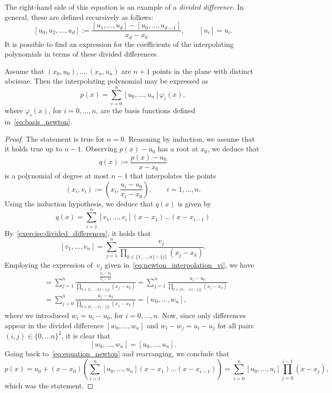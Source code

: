 The right-hand side of this equation is an example of a \emph{divided difference}.
In general, these are defined recursively as follows:
\[
    [u_{0}, u_{2}, \dotsc, u_{d}] := \frac{[u_{1}, \dotsc, u_{d}] - [u_{0}, \dotsc, u_{d-1}]}{x_{d}-x_{0}}, \qquad [u_i] = u_i.
\]
It is possible to find an expression for the coefficients of the interpolating polynomials in terms of these divided differences.
\begin{proposition}
    Assume that $(x_0, u_0), \dotsc, (x_n, u_n)$ are $n+1$ points in the plane with distinct abcissae.
    Then the interpolating polynomial may be expressed as
    \[
        p(x) = \sum_{i=0}^{n} [u_0, \dotsc, u_n] \varphi_i(x),
    \]
    where $\varphi_i(x)$, for $i = 0, \dotsc, n$, are the basis functions defined in~\eqref{eq:basis_newton}.
\end{proposition}
\begin{proof}
    The statement is true for $n = 0$.
    Reasoning by induction, we assume that it holds true up to $n-1$.
    Observing $p(x) - u_0$ has a root at $x_0$,
    we deduce that
    \begin{equation}
        \label{eq:equation_newton}
        q(x) :=
        \frac{p(x) - u_0}{x - x_0}
    \end{equation}
    is a polynomial of degree at most $n-1$ that interpolates the points
    \begin{equation}
        \label{eq:newton_interpolation_vi}
        \left(x_i, v_i\right) := \left(x_i, \frac{u_i - u_0}{x_i - x_0}\right), \qquad i = 1, \dotsc, n.
    \end{equation}
    Using the induction hypothesis,
    we deduce that $q(x)$ is given by
    \[
        q(x) = \sum_{i=1}^{n} [v_1, \dotsc, v_i] (x-x_1) \dotsc (x - x_{i-1})
    \]
    By~\cref{exercise:divided_differences},
    it holds that
    \[
        [v_1, \dotsc, v_n] = \sum_{j=1}^{n} \frac{v_{j}}{\prod_{ k \in \{1, \dotsc, n\} \backslash \{ j\}} (x_{j} - x_{k})}.
    \]
    Employing the expression of~$v_j$ given in~\eqref{eq:newton_interpolation_vi},
    we have
    \begin{align*}
        [v_1, \dotsc, v_n]
        &= \sum_{j=1}^{n} \frac{\frac{u_{j}-u_0}{x_j - x_0}}{\prod_{ k \in \{1, \dotsc, n\} \backslash \{ j\}} (x_{j} - x_{k})}
        = \sum_{j=1}^{n} \frac{u_{j}-u_0}{\prod_{ k \in \{0, \dotsc, n\} \backslash \{ j\}} (x_{j} - x_{k})} \\
        &= \sum_{j=0}^{n} \frac{u_{j}-u_0}{\prod_{ k \in \{0, \dotsc, n\} \backslash \{ j\}} (x_{j} - x_{k})} = [w_0, \dotsc, w_n],
    \end{align*}
    where we introduced $w_i = u_i - u_0$, for $i = 0, \dotsc, n$.
    Now, since only differences appear in the divided difference $[w_0, \dotsc, w_n]$ and $w_i - w_j = u_i - u_j$ for all pairs $(i, j) \in \{0, \dotsc n\}^2$,
    it is clear that
    \[
        [w_0, \dotsc, w_n] = [u_0, \dotsc, u_n].
    \]
    Going back to~\eqref{eq:equation_newton} and rearranging,
    we conclude that
    \[
        p(x) = u_0 + (x-x_0) \left( \sum_{i=1}^{n} [u_0, \dotsc, u_n] (x-x_1) \dotsc (x - x_{i-1}) \right)
        =  \sum_{i=0}^{n} [u_0, \dotsc, u_{i}] \prod_{j=0}^{i-1} (x-x_j),
    \]
    which was the statement.
\end{proof}
